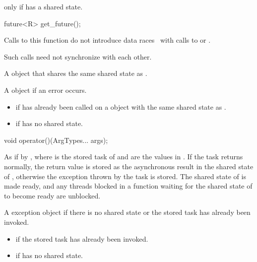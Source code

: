 \begin{itemdescr}
\pnum
\returns
{} only if  has a shared state.
\end{itemdescr}

%
\begin{itemdecl}
future<R> get_future();
\end{itemdecl}

\begin{itemdescr}
\pnum
\sync
Calls to this function do not introduce
data races~ with calls to
 or
.
\begin{note}
Such calls need not synchronize with each other.
\end{note}

\pnum
\returns
A  object that shares the same shared state as .

\pnum
\throws
A  object if an error occurs.

\pnum
\errors
\begin{itemize}
\item {} if  has already been called on
a  object with the same shared state as .
\item {} if  has no shared state.
\end{itemize}
\end{itemdescr}

%
\begin{itemdecl}
void operator()(ArgTypes... args);
\end{itemdecl}

\begin{itemdescr}
\pnum
\effects
As if by ,
where  is the
stored task of  and
 are the values in . If the task returns normally,
the return value is stored as the asynchronous result in the shared state of
, otherwise the exception thrown by the task is stored. The
shared state of  is made ready, and any threads blocked in a
function waiting for
the shared state of  to become ready are unblocked.

\pnum
\throws
A  exception object if there is no shared
state or the stored task has already been invoked.

\pnum
\errors
\begin{itemize}
\item {} if
the stored task has already been invoked.
\item {} if  has no shared state.
\end{itemize}
\end{itemdescr}

